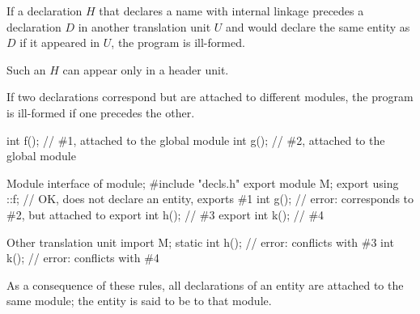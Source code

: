 \pnum
If a declaration $H$ that declares a name with internal linkage
precedes a declaration $D$ in another translation unit $U$ and
would declare the same entity as $D$ if it appeared in $U$,
the program is ill-formed.
\begin{note}
Such an $H$ can appear only in a header unit.
\end{note}

\pnum
\begin{note}
If two declarations correspond but are
attached to different modules, the program is ill-formed
if one precedes the other.
\end{note}
\begin{example}
\begin{codeblocktu}{}
int f();            // \#1, attached to the global module
int g();            // \#2, attached to the global module
\end{codeblocktu}

\begin{codeblocktu}{Module interface of }
module;
#include "decls.h"
export module M;
export using ::f;   // OK, does not declare an entity, exports \#1
int g();            // error: corresponds to \#2, but attached to 
export int h();     // \#3
export int k();     // \#4
\end{codeblocktu}

\begin{codeblocktu}{Other translation unit}
import M;
static int h();     // error: conflicts with \#3
int k();            // error: conflicts with \#4
\end{codeblocktu}
\end{example}
As a consequence of these rules,
all declarations of an entity are attached to the same module;
the entity is said to be  to that module.

